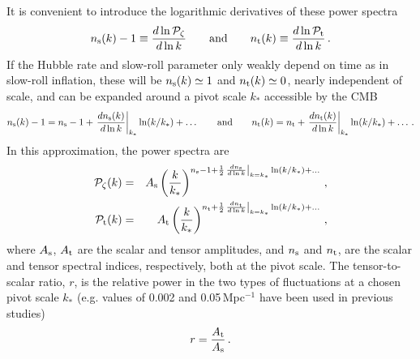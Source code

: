 It is convenient to introduce the logarithmic derivatives of these power spectra 
\begin{equation}\label{eq:specind}
n_{\rm s}(k)-1\equiv\frac{d\ln \mathcal{P}_{\zeta}}{d\ln k}\qquad{\rm and}\qquad n_{\rm t}(k)\equiv \frac{d\ln \mathcal{P}_{\rm t}}{d\ln k}\,.
\end{equation}
If the Hubble rate and slow-roll parameter only weakly depend on time as in slow-roll inflation, these will be $n_{\rm s}(k)\simeq 1$ and $n_{\rm t}(k)\simeq 0$, nearly independent of scale, and can be expanded around a pivot scale $k_\ast$ accessible by the CMB
\begin{equation}
n_{\rm s}(k)-1=n_{\rm s}-1+\left.\frac{dn_{\rm s}(k)}{d\ln k}\right|_{k_\ast}\ln(k/k_\ast)+\dots \qquad{\rm and}\qquad n_{\rm t}(k)=n_{\rm t}+\left.\frac{dn_{\rm t}(k)}{d\ln k}\right|_{k_\ast}\ln(k/k_\ast)+\dots \,.
\end{equation}
In this approximation, the power spectra are
\begin{eqnarray}\label{eq:power_spectra_power_law}
\mathcal{P}_{\zeta}(k)&=& A_{\rm s}\left(\frac{k}{k_\ast}\right)^{n_{\rm s}-1+\frac{1}{2}\left.\frac{dn_{\rm s}}{d\ln k}\right|_{k=k_\ast}\ln(k/k_\ast)+\dots}\,,\nonumber\\
\mathcal{P}_{\rm t}(k)&=& A_{\rm t} \left(\frac{k}{k_\ast}\right)^{n_{\rm t}+\frac{1}{2}\left.\frac{dn_{\rm t}}{d\ln k}\right|_{k=k_\ast}\ln(k/k_\ast)+\dots}\,,
\end{eqnarray}
where $A_{\rm s}$, $A_{\rm t}$ are the scalar and tensor amplitudes, and $n_{\rm s}$ and $n_{\rm t}$, are the scalar and tensor spectral indices, respectively, both at the pivot scale. 
The tensor-to-scalar ratio, $r$, is the relative power in the two types of fluctuations at a chosen pivot scale $k_\ast$ (e.g. values of 0.002 and
0.05\,Mpc$^{-1}$ have been used in previous studies)
\begin{equation}
r=\frac{A_{\rm t}}{A_{\rm s}}\,.
\end{equation}

